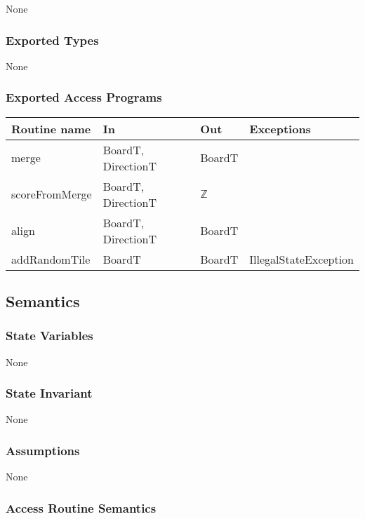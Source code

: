 \documentclass[12pt]{article}
\begin{document}
None

\subsubsection* {Exported Types}

None

\subsubsection* {Exported Access Programs}

\begin{tabular}{| l | l | l | p{5cm} |}
\hline
\textbf{Routine name} & \textbf{In} & \textbf{Out} & \textbf{Exceptions}\\
\hline
merge & BoardT, DirectionT & BoardT & \\
\hline
scoreFromMerge & BoardT, DirectionT & $\mathbb{Z}$ & \\
\hline
align & BoardT, DirectionT & BoardT & \\
\hline
addRandomTile & BoardT & BoardT & IllegalStateException \\
\hline
\end{tabular}

\subsection* {Semantics}

\subsubsection* {State Variables}

None

\subsubsection* {State Invariant}

None

\subsubsection* {Assumptions}

None

\newpage

\subsubsection* {Access Routine Semantics}
\end{document}
